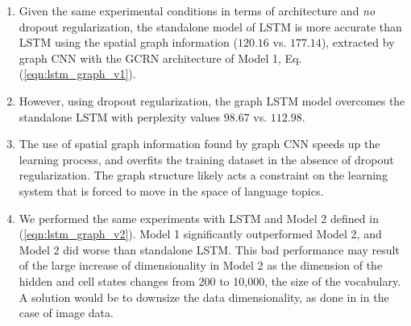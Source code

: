 \documentclass{article} %
\newcommand{\eqnref}[1]{(\ref{eqn:#1})}
\begin{document}
\begin{enumerate}
\item Given the same experimental conditions in terms of architecture and {\it no} dropout regularization, the standalone model of LSTM is more accurate than LSTM using the spatial graph information ($120.16$ vs. $177.14$), extracted by graph CNN with the GCRN architecture of Model 1, Eq. \eqnref{lstm_graph_v1}. 
\item However, using dropout regularization, the graph LSTM model overcomes the standalone LSTM with perplexity values $98.67$ vs. $112.98$. 
\item The use of spatial graph information found by graph CNN speeds up the learning process, and overfits the training dataset in the absence of dropout regularization. The graph structure likely acts a constraint on the learning system that is forced to move in the space of language topics.
\item We performed the same experiments with LSTM and Model 2 defined in \eqnref{lstm_graph_v2}. Model 1 significantly outperformed Model 2, and Model 2 did worse than standalone LSTM. This bad performance may result of the large increase of dimensionality in Model 2 as the dimension of the hidden and cell states changes from 200 to 10,000, the size of the vocabulary. A solution would be to downsize the data dimensionality, as done in \cite{convlstm} in the case of image data.
\end{enumerate}












\end{document}
